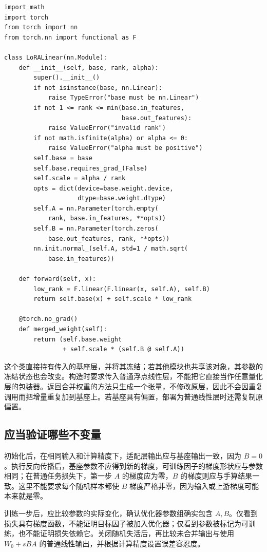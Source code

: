 \documentclass[UTF8,12pt,a4paper,fontset=fandol]{ctexart}
\begin{document}
\begin{verbatim}
import math
import torch
from torch import nn
from torch.nn import functional as F

class LoRALinear(nn.Module):
    def __init__(self, base, rank, alpha):
        super().__init__()
        if not isinstance(base, nn.Linear):
            raise TypeError("base must be nn.Linear")
        if not 1 <= rank <= min(base.in_features,
                                base.out_features):
            raise ValueError("invalid rank")
        if not math.isfinite(alpha) or alpha <= 0:
            raise ValueError("alpha must be positive")
        self.base = base
        self.base.requires_grad_(False)
        self.scale = alpha / rank
        opts = dict(device=base.weight.device,
                    dtype=base.weight.dtype)
        self.A = nn.Parameter(torch.empty(
            rank, base.in_features, **opts))
        self.B = nn.Parameter(torch.zeros(
            base.out_features, rank, **opts))
        nn.init.normal_(self.A, std=1 / math.sqrt(
            base.in_features))

    def forward(self, x):
        low_rank = F.linear(F.linear(x, self.A), self.B)
        return self.base(x) + self.scale * low_rank

    @torch.no_grad()
    def merged_weight(self):
        return (self.base.weight
                + self.scale * (self.B @ self.A))
\end{verbatim}

这个类直接持有传入的基座层，并将其冻结；若其他模块也共享该对象，其参数的冻结状态也会改变。构造时要求传入普通浮点线性层，不能把它直接当作任意量化层的包装器。返回合并权重的方法只生成一个张量，不修改原层，因此不会因重复调用而把增量重复加到基座上。若基座具有偏置，部署为普通线性层时还需复制原偏置。

\subsection{应当验证哪些不变量}

初始化后，在相同输入和计算精度下，适配层输出应与基座输出一致，因为 $B=0$。执行反向传播后，基座参数不应得到新的梯度，可训练因子的梯度形状应与参数相同；在普通任务损失下，第一步 $A$ 的梯度应为零，$B$ 的梯度则应与手算结果一致。这里不能要求每个随机样本都使 $B$ 梯度严格非零，因为输入或上游梯度可能本来就是零。

训练一步后，应比较参数的实际变化，确认优化器参数组确实包含 $A,B$。仅看到损失具有梯度函数，不能证明目标因子被加入优化器；仅看到参数被标记为可训练，也不能证明损失依赖它。关闭随机失活后，再比较未合并输出与使用
$W_0+sBA$ 的普通线性输出，并根据计算精度设置误差容忍度。
\end{document}
